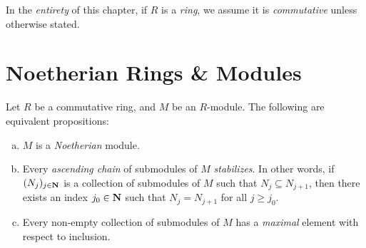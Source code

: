 \begin{remark}
\label{rem:commutative-rings-in-chapter-int-dom}
In the \emph{entirety} of this chapter, if \(R\) is a \emph{ring}, we assume it
is \emph{commutative} unless otherwise stated.
\end{remark}

\section{Noetherian Rings \& Modules}

\begin{proposition}
\label{prop:equiv-conditions-noetherian}
Let \(R\) be a commutative ring, and \(M\) be an \(R\)-module. The following are
equivalent propositions:
\begin{enumerate}[(a)]\setlength\itemsep{0em}
\item \(M\) is a \emph{Noetherian} module.

\item Every \emph{ascending chain} of submodules of \(M\) \emph{stabilizes}. In
  other words, if \((N_j)_{j \in \mathbf{N}}\) is a collection of submodules of \(M\)
  such that \(N_j \subseteq N_{j+1}\), then there exists an index \(j_0 \in \mathbf{N}\)
  such that \(N_j = N_{j+1}\) for all \(j \geq j_0\).

\item Every non-empty collection of submodules of \(M\) has a \emph{maximal}
  element with respect to inclusion.
\end{enumerate}
\end{proposition}

